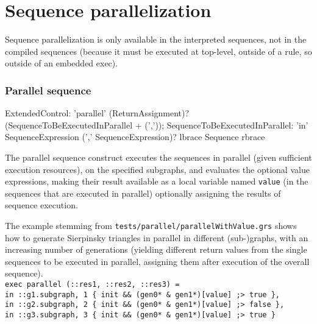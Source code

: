 \section{Sequence parallelization}\label{sec:sequenceparallelization}

Sequence parallelization is only available in the interpreted sequences, not in the compiled sequences (because it must be executed at top-level, outside of a rule, so outside of an embedded exec).

\subsubsection*{Parallel sequence}

\begin{rail}
  ExtendedControl: 'parallel' (ReturnAssignment)? (SequenceToBeExecutedInParallel + (','));
	SequenceToBeExecutedInParallel: 'in' SequenceExpression (',' SequenceExpression)? lbrace Sequence rbrace
\end{rail}

The parallel sequence construct executes the sequences in parallel (given sufficient execution resources),
on the specified subgraphs, and evaluates the optional value expressions, making their result available as a local variable named \texttt{value} (in the sequences that are executed in parallel) optionally assigning the results of sequence execution.

\begin{example}
The example stemming from \texttt{tests/parallel/parallelWithValue.grs} shows how to generate Sierpinsky triangles in parallel in different (sub-)graphs, with an increasing number of generations (yielding different return values from the single sequences to be executed in parallel, assigning them after execution of the overall sequence).\\
\verb#exec parallel (::res1, ::res2, ::res3) = #\\
\verb#in ::g1.subgraph, 1 { init && (gen0* & gen1*)[value] ;> true },#\\
\verb#in ::g2.subgraph, 2 { init && (gen0* & gen1*)[value] ;> false },#\\
\verb#in ::g3.subgraph, 3 { init && (gen0* & gen1*)[value] ;> true }#
\end{example}


